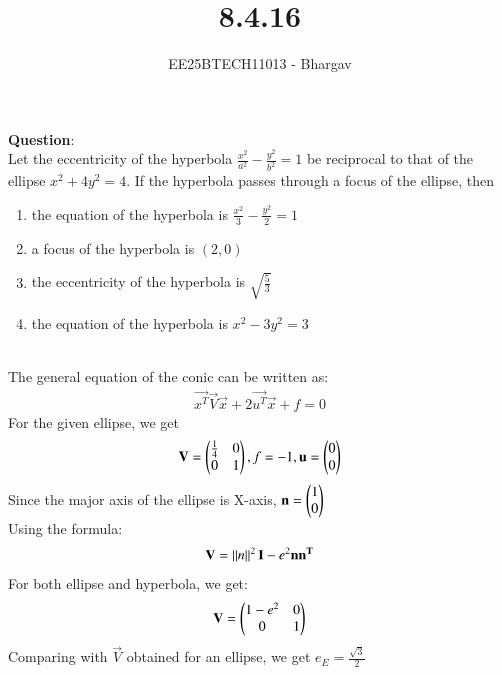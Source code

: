 \documentclass[journal]{IEEEtran}
\begin{document}

\vspace{3cm}

\title{8.4.16}
\author{EE25BTECH11013 - Bhargav}
\maketitle
    {\let\newpage\relax\maketitle}

\renewcommand{\thefigure}{\theenumi}
\renewcommand{\thetable}{\theenumi}
\setlength{\intextsep}{10pt} %

\renewcommand{\thetable}{\theenumi}

\textbf{Question}: \\
Let the eccentricity of the hyperbola $\frac{x^2}{a^2}-\frac{y^2}{b^2}=1$ be reciprocal to that of the ellipse $x^2+4y^2=4$. If the hyperbola
passes through a focus of the ellipse, then 

\begin{enumerate}
	\item the equation of the hyperbola is $\frac{x^2}{3}-\frac{y^2}{2}=1$
	\item a focus of the hyperbola is $(2,0)$
	\item the eccentricity of the hyperbola is $\sqrt{\frac{5}{3}}$
	\item the equation of the hyperbola is $x^2-3y^2=3$
\end{enumerate}
\solution \\
The general equation of the conic can be written as:
\begin{align}
\vec{x^T}\vec{V}\vec{x} + 2\vec{u^T}\vec{x} + f = 0
\end{align}
For the given ellipse, we get
\begin{align}
\mathbf{V} = \begin{pmatrix}\frac{1}{4} & 0 \\ 0 & 1\end{pmatrix}, f = -1, \mathbf{u} = \begin{pmatrix}0 \\ 0\end{pmatrix}
\end{align}
Since the major axis of the ellipse is X-axis, $\mathbf{n} = \begin{pmatrix}1 \\ 0\end{pmatrix}$ \\
Using the formula:
\begin{align}
\mathbf{V} = \left\lVert n\right\rVert^2\mathbf{I} - e^2\mathbf{n}\mathbf{n^T}
\end{align}
For both ellipse and hyperbola, we get:
\begin{align}
\mathbf{V} = \begin{pmatrix}1-e^2 & 0 \\ 0 & 1\end{pmatrix}
\end{align}
Comparing with $\vec{V}$ obtained for an ellipse, we get $e_E = \frac{\sqrt{3}}{2}$
\end{document}
